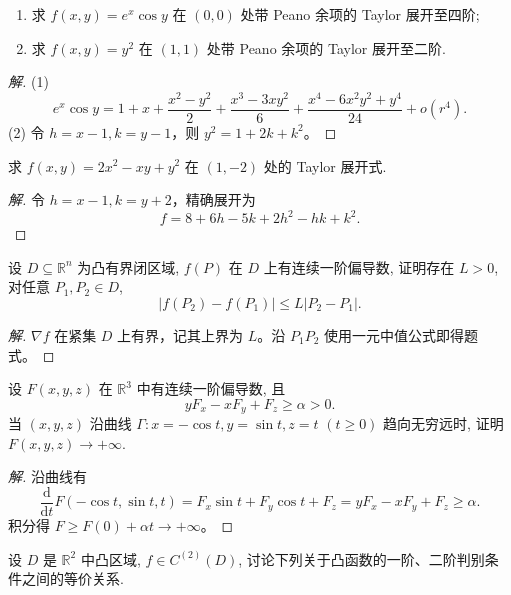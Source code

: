 \documentclass[../../数学分析培优讲义(答案版).tex]{subfiles}
\begin{document}
\begin{example}
\begin{enumerate}[label=(\arabic*)]
    \item 求 $f(x,y)=e^x\cos y$ 在 $(0,0)$ 处带 Peano 余项的 Taylor 展开至四阶;
    \item 求 $f(x,y)=y^2$ 在 $(1,1)$ 处带 Peano 余项的 Taylor 展开至二阶.
\end{enumerate}
\end{example}

\begin{proof}[解]
(1)
\[
e^x\cos y=1+x+\dfrac{x^2-y^2}{2}+\dfrac{x^3-3xy^2}{6}
+\dfrac{x^4-6x^2y^2+y^4}{24}+o(r^4).
\]
(2) 令 $h=x-1,k=y-1$，则 $y^2=1+2k+k^2$。
\end{proof}

\begin{example}
求 $f(x,y)=2x^2-xy+y^2$ 在 $(1,-2)$ 处的 Taylor 展开式.
\end{example}

\begin{proof}[解]
令 $h=x-1,k=y+2$，精确展开为
\[
f=8+6h-5k+2h^2-hk+k^2.
\]
\end{proof}

\begin{example}
设 $D\subseteq\mathbb{R}^n$ 为凸有界闭区域, $f(P)$ 在 $D$ 上有连续一阶偏导数, 证明存在 $L>0$, 对任意 $P_1,P_2\in D$,
\[
    |f(P_2)-f(P_1)|\leq L|P_2-P_1|.
\]
\end{example}

\begin{proof}[解]
$\nabla f$ 在紧集 $D$ 上有界，记其上界为 $L$。沿 $P_1P_2$ 使用一元中值公式即得题式。
\end{proof}

\begin{example}
设 $F(x,y,z)$ 在 $\mathbb{R}^3$ 中有连续一阶偏导数, 且
\[
    yF_x-xF_y+F_z\geq\alpha>0.
\]
当 $(x,y,z)$ 沿曲线 $\Gamma:x=-\cos t,y=\sin t,z=t$ $(t\geq0)$ 趋向无穷远时, 证明 $F(x,y,z)\to+\infty$.
\end{example}

\begin{proof}[解]
沿曲线有
\[
\dfrac{\mathrm d}{\mathrm dt}F(-\cos t,\sin t,t)=F_x\sin t+F_y\cos t+F_z
=yF_x-xF_y+F_z\geq\alpha.
\]
积分得 $F\geq F(0)+\alpha t\to+\infty$。
\end{proof}

\begin{example}
设 $D$ 是 $\mathbb{R}^2$ 中凸区域, $f\in C^{(2)}(D)$, 讨论下列关于凸函数的一阶、二阶判别条件之间的等价关系.
\end{example}
\end{document}
